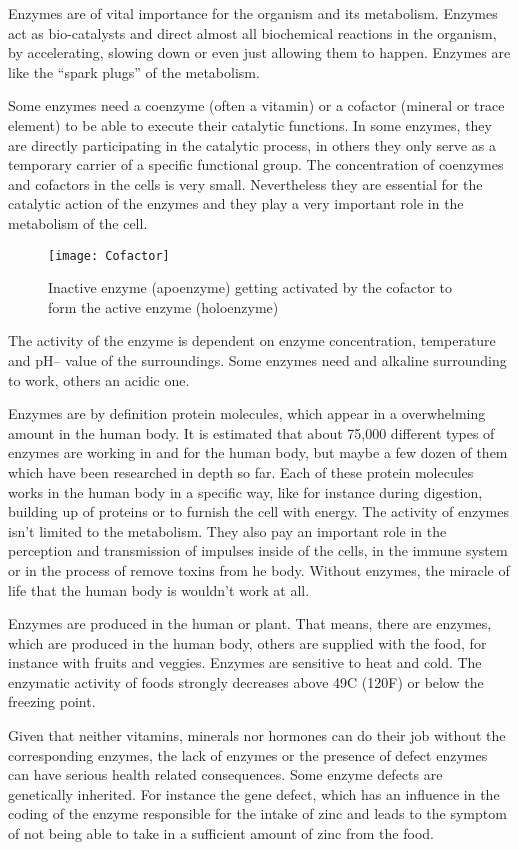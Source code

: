 \documentclass[../main.tex]{subfiles}
\begin{document}
Enzymes are of vital importance for the organism and its metabolism.
Enzymes act as bio-catalysts and direct almost all biochemical reactions in the organism, by accelerating, slowing down or even just allowing them to happen.
Enzymes are like the ``spark plugs'' of the metabolism.

Some enzymes need a coenzyme (often a vitamin) or a cofactor
(mineral or trace element) to be able to execute their catalytic functions.
In some enzymes, they are directly participating in the catalytic process,
in others they only serve as a temporary carrier of a specific functional group.
The concentration of coenzymes and cofactors in the cells is very small.
Nevertheless they are essential for the catalytic action of the enzymes and they play a very important role in the metabolism of the cell.

\begin{figure}[htb!]
\centering
  \texttt{[image: Cofactor]}
  \caption[Enzyme getting activated by cofactor]{Inactive enzyme (apoenzyme) getting activated by the cofactor to form the active enzyme (holoenzyme)\cite{Cofactor}}
\end{figure}

The activity of the enzyme is dependent on enzyme concentration, temperature and pH-- value of the surroundings.
Some enzymes need and alkaline surrounding to work, others an acidic one.

Enzymes are by definition protein molecules, which appear in a overwhelming amount in the human body.
It is estimated that about 75,000 different types of enzymes are working in and for the human body,
but maybe a few dozen of them which have been researched in depth so far.
Each of these protein molecules works in the human body in a specific way, like for instance during digestion,
building up of proteins or to furnish the cell with energy.
The activity of enzymes isn't limited to the metabolism.
They also pay an important role in the perception and transmission of impulses inside of the cells, in the immune system or
in the process of remove toxins from he body.
Without enzymes, the miracle of life that the human body is wouldn't work at all.

Enzymes are produced in the human or plant.
That means, there are enzymes, which are produced in the human body, others are supplied with the food, for instance with fruits and veggies.
Enzymes are sensitive to heat and cold.
The enzymatic activity of foods strongly decreases above 49\degree C (120\degree F) or below the freezing point.

Given that neither vitamins, minerals nor hormones can do their job without the corresponding enzymes, the lack of enzymes or the
presence of defect enzymes can have serious health related consequences.
Some enzyme defects are genetically inherited.
For instance the gene defect, which has an influence in the coding of the enzyme responsible for the intake of zinc and
leads to the symptom of not being able to take in a sufficient amount of zinc from the food.
\end{document}
